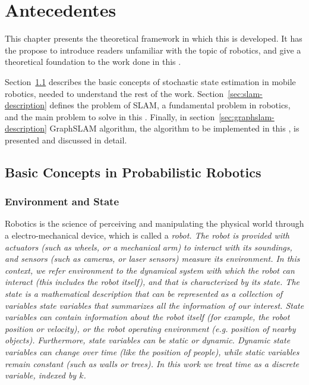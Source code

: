 \chapter{Antecedentes}

This chapter presents the theoretical framework in which this \mem{} is developed. It has the propose to introduce readers unfamiliar with the topic of robotics, and give a theoretical foundation to the work done in this \mem.

Section~\ref{sec:basic-concepts} describes the basic concepts of stochastic state estimation in mobile robotics, needed to understand the rest of the work. Section~\ref{sec:slam-description} defines the problem of SLAM, a fundamental problem in robotics, and the main problem to solve in this \mem. Finally, in section~\ref{sec:graphslam-description} GraphSLAM algorithm, the algorithm to be implemented in this \mem{}, is presented and discussed in detail.

\section{Basic Concepts in Probabilistic Robotics} 
\label{sec:basic-concepts}

\subsection{Environment and State}

Robotics is the science of perceiving and manipulating the physical world through a electro-mechanical device, which is called a \it{robot}. The robot is provided with actuators (such as wheels, or a mechanical arm) to interact with its soundings, and sensors (such as cameras, or laser sensors) measure its environment. In this context, we refer \it{environment} to the dynamical system with which the robot can interact (this includes the robot itself), and that is characterized by its \it{state}. The state is a mathematical description that can be represented as a collection of variables \it{state variables} that summarizes all the information of our interest. State variables can contain information about the robot itself (for example, the robot position or velocity), or the robot operating environment (e.g. position of nearby objects). Furthermore, state variables can be \it{static} or \it{dynamic}. Dynamic state variables can change over time (like the position of people), while static variables remain constant (such as walls or trees). In this work we treat time as a discrete variable, indexed by $k$.

